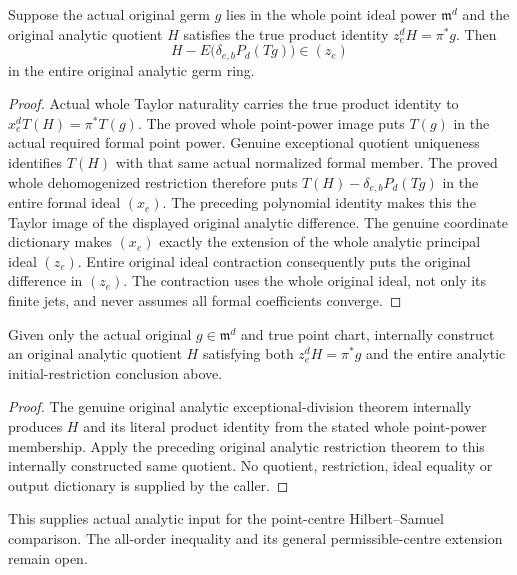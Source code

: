 \begin{theorem}
\label{hir:actual-analytic-point-normalized-initial-restriction}
\leanok
Suppose the actual original germ $g$ lies in the whole point ideal power
$\mathfrak m^d$ and the original analytic quotient $H$ satisfies the true
product identity $z_e^dH=\pi^*g$. Then
\[
 H-E\bigl(\delta_{e,b}P_d(Tg)\bigr)\in(z_e)
\]
in the entire original analytic germ ring.
\end{theorem}
\begin{proof}
Actual whole Taylor naturality carries the true product identity to
$x_e^dT(H)=\pi^*T(g)$. The proved whole point-power image puts $T(g)$
in the actual required formal point power. Genuine exceptional quotient
uniqueness identifies $T(H)$ with that same actual normalized formal
member. The proved whole dehomogenized restriction therefore puts
$T(H)-\delta_{e,b}P_d(Tg)$ in the entire formal ideal $(x_e)$.
The preceding polynomial identity makes this the Taylor image of the
displayed original analytic difference. The genuine coordinate dictionary
makes $(x_e)$ exactly the extension of the whole analytic principal ideal
$(z_e)$. Entire original ideal contraction consequently puts the original
difference in $(z_e)$. The contraction uses the whole original ideal, not
only its finite jets, and never assumes all formal coefficients converge.
\end{proof}

\begin{theorem}
\label{hir:actual-analytic-point-initial-restriction-producer}
\leanok
Given only the actual original $g\in\mathfrak m^d$ and true point chart,
internally construct an original analytic quotient $H$ satisfying both
$z_e^dH=\pi^*g$ and the entire analytic initial-restriction conclusion above.
\end{theorem}
\begin{proof}
The genuine original analytic exceptional-division theorem internally
produces $H$ and its literal product identity from the stated whole
point-power membership. Apply the preceding original analytic restriction
theorem to this internally constructed same quotient. No quotient,
restriction, ideal equality or output dictionary is supplied by the caller.
\end{proof}

This supplies actual analytic input for the point-centre Hilbert--Samuel
comparison. The all-order inequality and its general permissible-centre
extension remain open.
